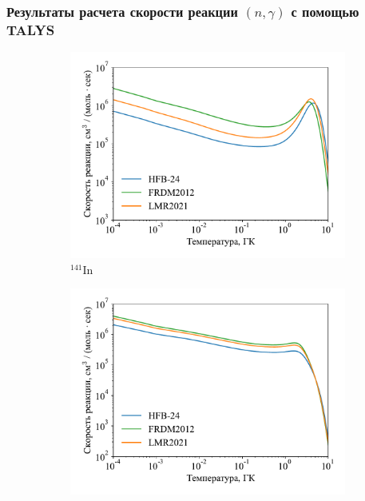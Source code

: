 \subsubsection{Результаты расчета скорости реакции $(n,\gamma)$ с помощью TALYS}

\begin{figure}
  \centering
  \begin{subfigure}{0.48\textwidth}
    \centering
    \includegraphics[width=\textwidth]{../pics/rate_in141.pdf}
    \caption{${}^{141}$In}
    \label{fig:ng_rate:141in}
  \end{subfigure}
  \hfill
  \begin{subfigure}{0.48\textwidth}
    \centering
    \includegraphics[width=\textwidth]{../pics/rate_in142.pdf}

\end{subfigure}
\end{figure}
